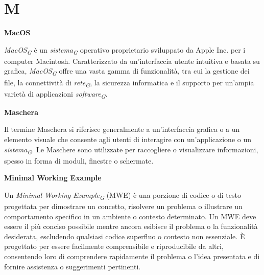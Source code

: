 \documentclass{article}
\begin{document}
\pagebreak
\section*{M}
{}

\vspace{0.4cm}

\textbf{MacOS}

\vspace{0.1cm}

\textit{MacOS}\textsubscript{\textit{G}} è un \textit{sistema}\textsubscript{\textit{G}} operativo proprietario sviluppato da Apple Inc. per i computer Macintosh. Caratterizzato da un'interfaccia utente intuitiva e basata su grafica, \textit{MacOS}\textsubscript{\textit{G}} offre una vasta gamma di funzionalità, tra cui la gestione dei file, la connettività di \textit{rete}\textsubscript{\textit{G}}, la sicurezza informatica e il supporto per un'ampia varietà di applicazioni \textit{software}\textsubscript{\textit{G}}.


\vspace{0.4cm}

\textbf{Maschera}

\vspace{0.1cm}

Il termine Maschera si riferisce generalmente a un'interfaccia grafica o a un elemento visuale che consente agli utenti di interagire con un'applicazione o un \textit{sistema}\textsubscript{\textit{G}}. Le Maschere sono utilizzate per raccogliere o visualizzare informazioni, spesso in forma di moduli, finestre o schermate.

\vspace{0.4cm}

\textbf{Minimal Working Example}

\vspace{0.1cm}

Un \textit{Minimal Working Example}\textsubscript{\textit{G}} (MWE) è una porzione di codice o di testo progettata per dimostrare un concetto, risolvere un problema o illustrare un comportamento specifico in un ambiente o contesto determinato. Un MWE deve essere il più conciso possibile mentre ancora esibisce il problema o la funzionalità desiderata, escludendo qualsiasi codice superfluo o contesto non essenziale. È progettato per essere facilmente comprensibile e riproducibile da altri, consentendo loro di comprendere rapidamente il problema o l'idea presentata e di fornire assistenza o suggerimenti pertinenti.
\end{document}
